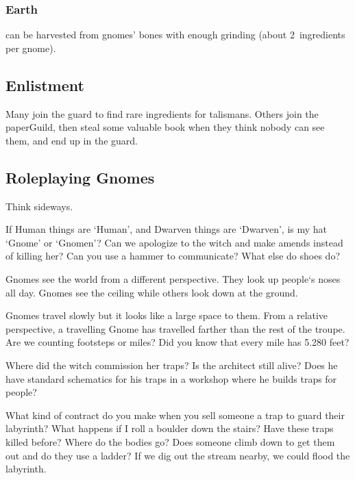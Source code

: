 \subsubsection{Earth }
can be harvested from gnomes' bones with enough grinding (about 2~\glspl{ingredient} per gnome).

\subsection{Enlistment}

Many join the \gls{guard} to find rare \glspl{ingredient} for \glspl{talisman}.
Others join the \gls{paperGuild}, then steal some valuable book when they think nobody can see them, and end up in the \gls{guard}.

\subsection{Roleplaying Gnomes}

{\raggedleft Think sideways.\par}
\noindent
If Human things are `Human', and Dwarven things are `Dwarven', is my hat `Gnome' or `Gnomen'?
Can we apologize to the \gls{witch} and make amends instead of killing her?
Can you use a hammer to communicate?
What else do shoes do?

Gnomes see the world from a different perspective.
They look up people`s noses all day.
Gnomes see the ceiling while others look down at the ground.

Gnomes travel slowly but it looks like a large space to them.
From a relative perspective, a travelling Gnome has travelled farther than the rest of the troupe.
Are we counting footsteps or miles?
Did you know that every mile has 5.280 feet?

Where did the \gls{witch} commission her traps?
Is the architect still alive?
Does he have standard schematics for his traps in a workshop where he builds traps for people?

What kind of contract do you make when you sell someone a trap to guard their labyrinth?
What happens if I roll a boulder down the stairs?
Have these traps killed before?
Where do the bodies go?
Does someone climb down to get them out and do they use a ladder?
If we dig out the stream nearby, we could flood the labyrinth.


